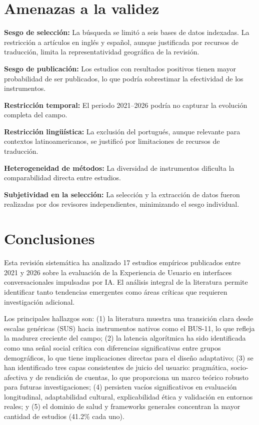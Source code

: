 \documentclass[11pt,twocolumn]{article}
\begin{document}
\section{Amenazas a la validez}

\textbf{Sesgo de selección:} La búsqueda se limitó a seis bases de datos indexadas. La restricción a artículos en inglés y español, aunque justificada por recursos de traducción, limita la representatividad geográfica de la revisión.

\textbf{Sesgo de publicación:} Los estudios con resultados positivos tienen mayor probabilidad de ser publicados, lo que podría sobrestimar la efectividad de los instrumentos.

\textbf{Restricción temporal:} El periodo 2021--2026 podría no capturar la evolución completa del campo.

\textbf{Restricción lingüística:} La exclusión del portugués, aunque relevante para contextos latinoamericanos, se justificó por limitaciones de recursos de traducción.

\textbf{Heterogeneidad de métodos:} La diversidad de instrumentos dificulta la comparabilidad directa entre estudios.

\textbf{Subjetividad en la selección:} La selección y la extracción de datos fueron realizadas por dos revisores independientes, minimizando el sesgo individual.

\section{Conclusiones}

Esta revisión sistemática ha analizado 17 estudios empíricos publicados entre 2021 y 2026 sobre la evaluación de la Experiencia de Usuario en interfaces conversacionales impulsadas por IA. El análisis integral de la literatura permite identificar tanto tendencias emergentes como áreas críticas que requieren investigación adicional.

Los principales hallazgos son: (1) la literatura muestra una transición clara desde escalas genéricas (SUS) hacia instrumentos nativos como el BUS-11, lo que refleja la madurez creciente del campo; (2) la latencia algorítmica ha sido identificada como una señal social crítica con diferencias significativas entre grupos demográficos, lo que tiene implicaciones directas para el diseño adaptativo; (3) se han identificado tres capas consistentes de juicio del usuario: pragmática, socio-afectiva y de rendición de cuentas, lo que proporciona un marco teórico robusto para futuras investigaciones; (4) persisten vacíos significativos en evaluación longitudinal, adaptabilidad cultural, explicabilidad ética y validación en entornos reales; y (5) el dominio de salud y frameworks generales concentran la mayor cantidad de estudios (41.2\% cada uno).
\end{document}
